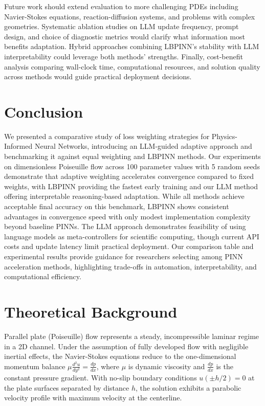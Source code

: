 \documentclass{article}
\begin{document}
Future work should extend evaluation to more challenging PDEs including Navier-Stokes equations, reaction-diffusion systems, and problems with complex geometries. Systematic ablation studies on LLM update frequency, prompt design, and choice of diagnostic metrics would clarify what information most benefits adaptation. Hybrid approaches combining LBPINN's stability with LLM interpretability could leverage both methods' strengths. Finally, cost-benefit analysis comparing wall-clock time, computational resources, and solution quality across methods would guide practical deployment decisions.

\section{Conclusion}

We presented a comparative study of loss weighting strategies for Physics-Informed Neural Networks, introducing an LLM-guided adaptive approach and benchmarking it against equal weighting and LBPINN methods. Our experiments on dimensionless Poiseuille flow across 100 parameter values with 5 random seeds demonstrate that adaptive weighting accelerates convergence compared to fixed weights, with LBPINN providing the fastest early training and our LLM method offering interpretable reasoning-based adaptation. While all methods achieve acceptable final accuracy on this benchmark, LBPINN shows consistent advantages in convergence speed with only modest implementation complexity beyond baseline PINNs. The LLM approach demonstrates feasibility of using language models as meta-controllers for scientific computing, though current API costs and update latency limit practical deployment. Our comparison table and experimental results provide guidance for researchers selecting among PINN acceleration methods, highlighting trade-offs in automation, interpretability, and computational efficiency.




\appendix

\section{Theoretical Background}
\label{app:theory}

Parallel plate (Poiseuille) flow represents a steady, incompressible laminar regime in a 2D channel. Under the assumption of fully developed flow with negligible inertial effects, the Navier-Stokes equations reduce to the one-dimensional momentum balance $\mu \frac{d^2 u}{dy^2} = \frac{dp}{dx}$, where $\mu$ is dynamic viscosity and $\frac{dp}{dx}$ is the constant pressure gradient. With no-slip boundary conditions $u(\pm h/2) = 0$ at the plate surfaces separated by distance $h$, the solution exhibits a parabolic velocity profile with maximum velocity at the centerline.
\end{document}
